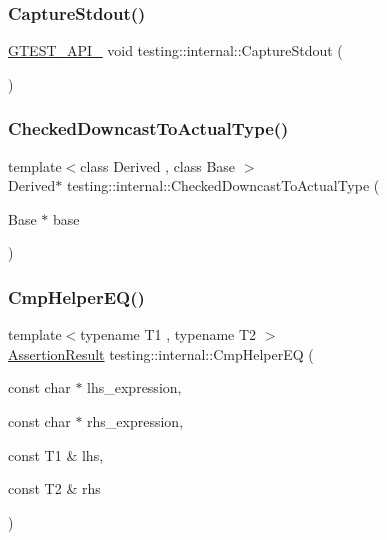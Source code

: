 \mbox{\label{namespacetesting_1_1internal_acba06d4f0343dec407738ba5544af990}} 
\subsubsection{\texorpdfstring{CaptureStdout()}{CaptureStdout()}}
{\footnotesize\ttfamily \mbox{\hyperlink{gtest-port_8h_aa73be6f0ba4a7456180a94904ce17790}{G\+T\+E\+S\+T\+\_\+\+A\+P\+I\+\_\+}} void testing\+::internal\+::\+Capture\+Stdout (\begin{DoxyParamCaption}{ }\end{DoxyParamCaption})}

\mbox{\label{namespacetesting_1_1internal_abfe9bfb020d38aa4e0e12c001911b22b}} 
\subsubsection{\texorpdfstring{CheckedDowncastToActualType()}{CheckedDowncastToActualType()}}
{\footnotesize\ttfamily template$<$class Derived , class Base $>$ \\
Derived$\ast$ testing\+::internal\+::\+Checked\+Downcast\+To\+Actual\+Type (\begin{DoxyParamCaption}\item[{Base $\ast$}]{base }\end{DoxyParamCaption})}

\mbox{\label{namespacetesting_1_1internal_a4638c74d9b32e971f9b321af6fafc2f1}} 
\subsubsection{\texorpdfstring{CmpHelperEQ()}{CmpHelperEQ()}\hspace{0.1cm}{\footnotesize\ttfamily [1/2]}}
{\footnotesize\ttfamily template$<$typename T1 , typename T2 $>$ \\
\mbox{\hyperlink{classtesting_1_1_assertion_result}{Assertion\+Result}} testing\+::internal\+::\+Cmp\+Helper\+EQ (\begin{DoxyParamCaption}\item[{const char $\ast$}]{lhs\+\_\+expression,  }\item[{const char $\ast$}]{rhs\+\_\+expression,  }\item[{const T1 \&}]{lhs,  }\item[{const T2 \&}]{rhs }\end{DoxyParamCaption})}


